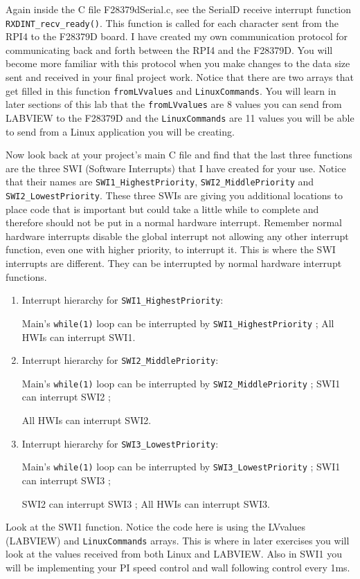 \documentclass[11pt]{article}
\begin{document}
Again inside the C file F28379dSerial.c, see the SerialD receive interrupt function \texttt{RXDINT_recv_ready()}. This function is called for each character sent from the RPI4 to the F28379D board. I have created my own communication protocol for communicating back and forth between the RPI4 and the F28379D. You will become more familiar with this protocol when you make changes to the data size sent and received in your final project work. Notice that there are two arrays that get filled in this function \texttt{fromLVvalues} and \texttt{LinuxCommands}. You will learn in later sections of this lab that the \texttt{fromLVvalues} are 8 values you can send from LABVIEW to the F28379D and the \texttt{LinuxCommands} are 11 values you will be able to send from a Linux application you will be creating.

Now look back at your project’s main C file and find that the last three functions are the three SWI (Software Interrupts) that I have created for your use. Notice that their names are \texttt{SWI1_HighestPriority}, \texttt{SWI2_MiddlePriority} and \texttt{SWI2_LowestPriority}. These three SWIs are giving you additional locations to place code that is important but could take a little while to complete and therefore should not be put in a normal hardware interrupt. Remember normal hardware interrupts disable the global interrupt not allowing any other interrupt function, even one with higher priority, to interrupt it. This is where the SWI interrupts are different. They can be interrupted by normal hardware interrupt functions.
%
\begin{enumerate}
        \item Interrupt hierarchy for \texttt{SWI1_HighestPriority}:

        Main’s \texttt{while(1)} loop can be interrupted by \texttt{SWI1_HighestPriority} ; All HWIs can interrupt SWI1.
        \item Interrupt hierarchy for \texttt{SWI2_MiddlePriority}:

        Main’s \texttt{while(1)} loop can be interrupted by \texttt{SWI2_MiddlePriority} ; SWI1 can interrupt SWI2 ;

        All HWIs can interrupt SWI2.
        \item Interrupt hierarchy for \texttt{SWI3_LowestPriority}:

        Main’s \texttt{while(1)} loop can be interrupted by \texttt{SWI3_LowestPriority} ; SWI1 can interrupt SWI3 ;

        SWI2 can interrupt SWI3 ; All HWIs can interrupt SWI3.
\end{enumerate}
%
Look at the SWI1 function. Notice the code here is using the LVvalues (LABVIEW) and \texttt{LinuxCommands} arrays. This is where in later exercises you will look at the values received from both Linux and LABVIEW. Also in SWI1 you will be implementing your PI speed control and wall following control every 1ms.
\end{document}
